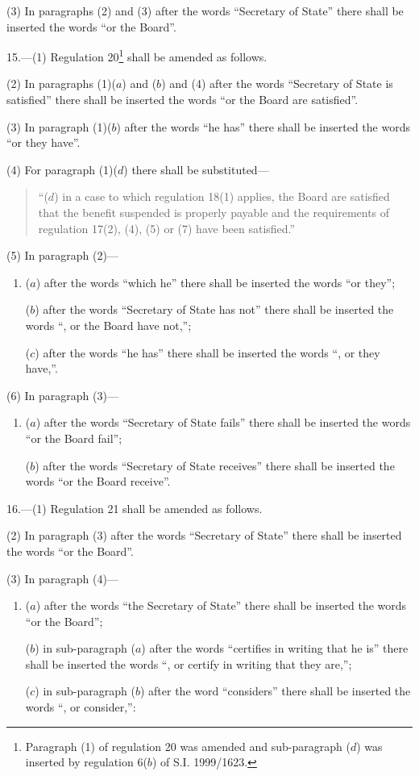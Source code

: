 \documentclass[12pt,a4paper]{article}
\begin{document}
(3) In paragraphs (2) and (3) after the words “Secretary of State” there shall be inserted the words “or the Board”.

\medskip

15.---(1)  Regulation 20\footnote{\frenchspacing Paragraph (1) of regulation 20 was amended and sub-paragraph ($d$) was inserted by regulation 6($b$) of S.I. 1999/1623.} shall be amended as follows.

(2) In paragraphs (1)($a$)  and ($b$)  and (4) after the words “Secretary of State is satisfied” there shall be inserted the words “or the Board are satisfied”.

(3) In paragraph (1)($b$)  after the words “he has” there shall be inserted the words “or they have”.

(4) For paragraph (1)($d$)  there shall be substituted—
\begin{quotation}
“($d$) in a case to which regulation 18(1) applies, the Board are satisfied that the benefit suspended is properly payable and the requirements of regulation 17(2), (4), (5) or (7) have been satisfied.”
\end{quotation}

(5) In paragraph (2)—
\begin{enumerate}\item[]
($a$) after the words “which he” there shall be inserted the words “or they”;

($b$) after the words “Secretary of State has not” there shall be inserted the words “, or the Board have not,”;

($c$) after the words “he has” there shall be inserted the words “, or they have,”.
\end{enumerate}

(6) In paragraph (3)—
\begin{enumerate}\item[]
($a$) after the words “Secretary of State fails” there shall be inserted the words “or the Board fail”;

($b$) after the words “Secretary of State receives” there shall be inserted the words “or the Board receive”.
\end{enumerate}

\medskip

16.---(1)  Regulation 21 shall be amended as follows.

(2) In paragraph (3) after the words “Secretary of State” there shall be inserted the words “or the Board”.

(3) In paragraph (4)—
\begin{enumerate}\item[]
($a$) after the words “the Secretary of State” there shall be inserted the words “or the Board”;

($b$) in sub-paragraph ($a$)  after the words “certifies in writing that he is” there shall be inserted the words “, or certify in writing that they are,”;

($c$) in sub-paragraph ($b$)  after the word “considers” there shall be inserted the words “, or consider,”:
\end{enumerate}
\end{document}
